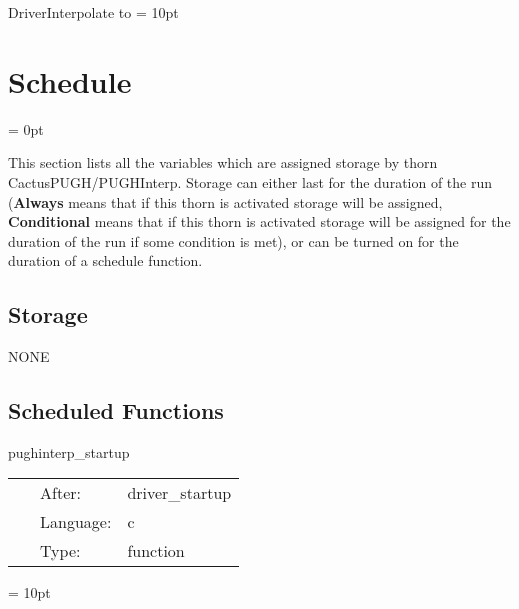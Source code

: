 \documentclass{article}
\begin{document}
DriverInterpolate to 
\vspace{2mm}\parskip = 10pt 

\section{Schedule} 


\parskip = 0pt


\noindent This section lists all the variables which are assigned storage by thorn CactusPUGH/PUGHInterp.  Storage can either last for the duration of the run ({\bf Always} means that if this thorn is activated storage will be assigned, {\bf Conditional} means that if this thorn is activated storage will be assigned for the duration of the run if some condition is met), or can be turned on for the duration of a schedule function.


\subsection*{Storage}NONE
\subsection*{Scheduled Functions}
\vspace{5mm}


\hspace{5mm} pughinterp\_startup 

\hspace{5mm}{\it pughinterp startup routine } 


\hspace{5mm}

 \begin{tabular*}{160mm}{cll} 
~ & After:  & driver\_startup \\ 
~ & Language:  & c \\ 
~ & Type:  & function \\ 
\end{tabular*} 



\vspace{5mm}\parskip = 10pt 
\end{document}
